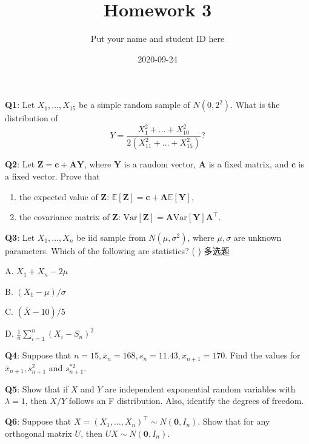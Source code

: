 \documentclass[]{article}
\title{Homework 3}
\author{Put your name and student ID here}
\date{2020-09-24}
\begin{document}
\maketitle

\textbf{Q1}: Let \(X_1,\dots,X_{15}\) be a simple random sample of
\(N(0,2^2)\). What is the distribution of
\[Y=\frac{X_1^2+\dots+X_{10}^2}{2(X_{11}^2+\dots+X_{15}^2)}?\]

\textbf{Q2}: Let \(\boldsymbol Z = \boldsymbol c + \boldsymbol{AY}\),
where \(\boldsymbol Y\) is a random vector, \(\boldsymbol A\) is a fixed
matrix, and \(\boldsymbol c\) is a fixed vector. Prove that

\begin{enumerate}
\def\labelenumi{\arabic{enumi}.}
\item
  the expected value of \(\boldsymbol Z\):
  \(\mathbb E[\boldsymbol Z]=\boldsymbol c + \boldsymbol{A}\mathbb E[\boldsymbol Y],\)
\item
  the covariance matrix of \(\boldsymbol Z\):
  \(\mathrm{Var}[\boldsymbol Z]=\boldsymbol A \mathrm{Var}[\boldsymbol Y] \boldsymbol A^\top\).
\end{enumerate}

\textbf{Q3}: Let \(X_1,\dots,X_n\) be iid sample from
\(N(\mu,\sigma^2)\), where \(\mu,\sigma\) are unknown parameters. Which
of the following are statistics? ( ) 多选题

A. \(X_1+X_n-2\mu\)

B. \((X_1-\mu)/\sigma\)

C. \((\bar X-10)/5\)

D. \(\frac 1 n\sum_{i=1}^n(X_i-S_n)^2\)

\textbf{Q4}: Suppose that
\(n=15,\bar x_{n}=168, s_n=11.43, x_{n+1}=170\). Find the values for
\(\bar x_{n+1},s_{n+1}^2\) and \(s_{n+1}^{*2}\).

\textbf{Q5}: Show that if \(X\) and \(Y\) are independent exponential
random variables with \(\lambda = 1\), then \(X/Y\) follows an F
distribution. Also, identify the degrees of freedom.

\textbf{Q6}: Suppose that
\(X=(X_1,\dots,X_n)^\top\sim N(\mathbf 0,I_n)\). Show that for any
orthogonal matrix \(U\), then \(UX\sim N(\mathbf 0,I_n)\).
\end{document}
